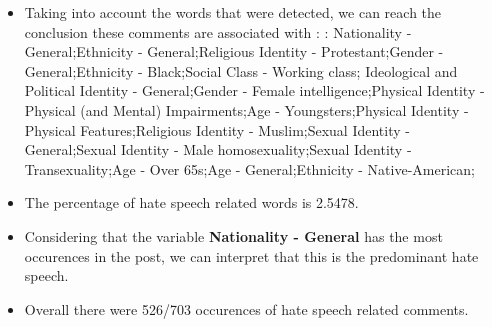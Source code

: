 \documentclass[11pt]{article}
\begin{document}
\begin{itemize}\item Taking into account the words that were detected, we can reach the conclusion these comments are associated with : : Nationality - General;Ethnicity - General;Religious Identity - Protestant;Gender - General;Ethnicity - Black;Social Class - Working class; Ideological and Political Identity - General;Gender - Female intelligence;Physical Identity - Physical (and Mental) Impairments;Age - Youngsters;Physical Identity - Physical Features;Religious Identity - Muslim;Sexual Identity - General;Sexual Identity - Male homosexuality;Sexual Identity - Transexuality;Age - Over 65s;Age - General;Ethnicity - Native-American;%

\item The percentage of hate speech related words is 2.5478.

\item Considering that the variable \textbf{Nationality - General} has the most occurences in the post, we can interpret that this is the predominant hate speech.

\item Overall there were 526/703 occurences of hate speech related comments.\end{itemize}
\end{document}
